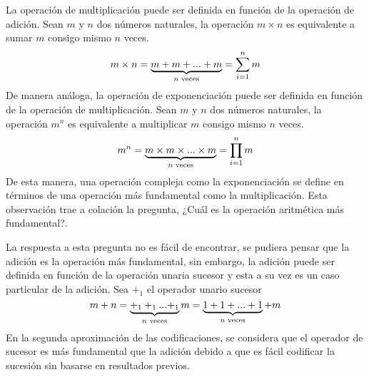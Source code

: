 La operación de multiplicación puede ser definida en función de la operación de adición. Sean \( m \) y \( n \) dos números naturales, la operación \( m \times n \) es equivalente a sumar \( m \) consigo mismo \( n \) veces.
\begin{equation}
  \label{eq:numeral:muldef}
  m \times n = \underbrace{m + m + ... + m}_\text{\( n \) veces} = \sum_{i=1}^{n} m
\end{equation}
De manera análoga, la operación de exponenciación puede ser definida en función de la operación de multiplicación. Sean \( m \) y \( n \) dos números naturales, la operación \( m^{n} \) es equivalente a multiplicar \( m \) consigo mismo \( n \) veces.
\begin{equation}
  \label{eq:numeral:expdef}
  m^{n} = \underbrace{m \times m \times ... \times m}_\text{\( n \) veces} = \prod_{i=1}^{n} m
\end{equation}
De esta manera, una operación compleja como la exponenciación se define en términos de una operación más fundamental como la multiplicación. Esta observación trae a colación la pregunta, ¿Cuál es la operación aritmética más fundamental?.

La respuesta a esta pregunta no es fácil de encontrar, se pudiera pensar que la adición es la operación más fundamental, sin embargo, la adición puede ser definida en función de la operación unaria sucesor y esta a su vez es un caso particular de la adición. Sea \( +_{1} \) el operador unario sucesor
\[ m + n = \underbrace{+_{1} +_{1} ... {} +_{1}}_\text{\( n \) veces} m = \underbrace{1 + 1 + ... + 1}_\text{\( n \) veces}+m \]
En la segunda aproximación de las codificaciones, se considera que el operador de sucesor es más fundamental que la adición debido a que es fácil codificar la sucesión sin basarse en resultados previos.

